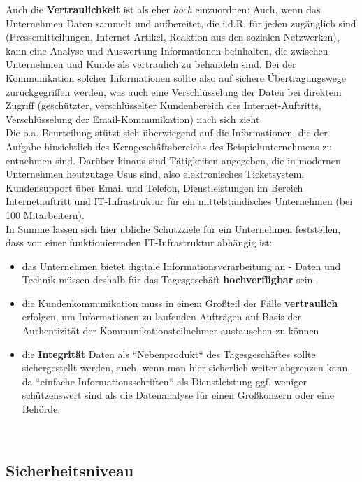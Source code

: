 Auch die \textbf{Vertraulichkeit} ist als eher \textit{hoch} einzuordnen: Auch, wenn das Unternehmen Daten sammelt und aufbereitet, die i.d.R. für jeden zugänglich sind (Pressemitteilungen, Internet-Artikel, Reaktion aus den sozialen Netzwerken), kann eine Analyse und Auswertung Informationen beinhalten, die zwischen Unternehmen und Kunde als vertraulich zu behandeln sind.
Bei der Kommunikation solcher Informationen sollte also auf sichere Übertragungswege zurückgegriffen werden, was auch eine Verschlüsselung der Daten bei direktem Zugriff (geschützter, verschlüsselter Kundenbereich des Internet-Auftritts, Verschlüsselung der Email-Kommunikation) nach sich zieht.\\


Die o.a. Beurteilung stützt sich überwiegend auf die Informationen, die der Aufgabe hinsichtlich des Kerngeschäftsbereichs des Beispielunternehmens zu entnehmen sind. Darüber hinaus sind Tätigkeiten angegeben, die in modernen Unternehmen heutzutage Usus sind, also elektronisches Ticketsystem, Kundensupport über Email und Telefon, Dienstleistungen im Bereich Internetauftritt und IT-Infrastruktur für ein mittelständisches Unternehmen (bei 100 Mitarbeitern).\\
In Summe lassen sich hier übliche Schutzziele für ein Unternehmen feststellen, dass von einer funktionierenden IT-Infrastruktur abhängig ist:
\begin{itemize}
    \itemsep0.5em
    \item das Unternehmen bietet digitale Informationsverarbeitung an - Daten und Technik müssen deshalb für das Tagesgeschäft \textbf{hochverfügbar} sein.
    \item die Kundenkommunikation muss in einem Großteil der Fälle \textbf{vertraulich} erfolgen, um Informationen zu laufenden Aufträgen auf Basis der Authentizität der Kommunikationsteilnehmer austauschen zu können
    \item die \textbf{Integrität} Daten als ``Nebenprodukt`` des Tagesgeschäftes sollte sichergestellt werden, auch, wenn man hier sicherlich weiter abgrenzen kann, da ``einfache Informationsschriften`` als Dienstleistung ggf. weniger schützenswert sind als die Datenanalyse für einen Großkonzern oder eine Behörde.
\end{itemize}\\


\subsection*{Sicherheitsniveau}

